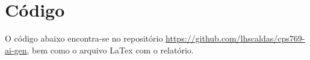 \documentclass[12 pt]{article}
\begin{document}
\section*{Código}

O código abaixo encontra-se no repositório \href{https://github.com/lhscaldas/cps769-ai-gen}{https://github.com/lhscaldas/cps769-ai-gen}, bem como o arquivo LaTex com o relatório.


% 
\end{document}
